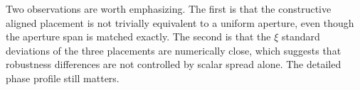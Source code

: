 Two observations are worth emphasizing. The first is that the constructive aligned placement is not trivially equivalent to a uniform aperture, even though the aperture span is matched exactly. The second is that the $\xi$ standard deviations of the three placements are numerically close, which suggests that robustness differences are not controlled by scalar spread alone. The detailed phase profile still matters.

